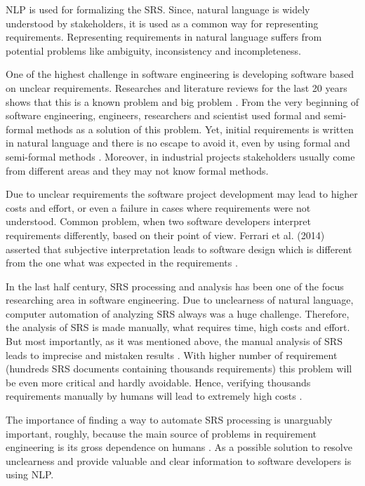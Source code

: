 \begin{multicols*}{2}	
	\gls{NLP} is used for formalizing the \gls{SRS}. Since, natural language is widely understood by stakeholders, it is used as a common way for representing requirements. Representing requirements in natural language suffers from potential problems like ambiguity, inconsistency and incompleteness.
	
	One of the highest challenge in software engineering is developing software based on unclear requirements. Researches and literature reviews for the last 20 years shows that this is a known problem and big problem \cite{Besrour}. From the very beginning of software engineering, engineers, researchers and scientist used formal and semi-formal methods as a solution of this problem. Yet, initial requirements is written in natural language and there is no escape to avoid it, even by using formal and semi-formal methods \cite{Kamsties}. Moreover, in industrial projects stakeholders usually come from different areas and they may not know formal methods.
	
	Due to unclear requirements the software project development may lead to higher costs and effort, or even a failure in cases where requirements were not understood.
	Common problem, when two software developers interpret requirements differently, based on their point of view. Ferrari et al. (2014) asserted that subjective interpretation leads to software design which is different from the one what was expected in the requirements \cite{Ferrari}.
	
	In the last half century, \gls{SRS} processing and analysis has been one of the focus researching area in software engineering. Due to unclearness of natural language, computer automation of analyzing \gls{SRS} always was a huge challenge. Therefore, the analysis of \gls{SRS} is made manually, what requires time, high costs and effort. But most importantly, as it was mentioned above, the manual analysis of \gls{SRS} leads to imprecise and mistaken results \cite{Wang}. With higher number of requirement (hundreds \gls{SRS} documents containing thousands requirements) this problem will be even more critical and hardly avoidable. Hence, verifying thousands requirements manually by humans will lead to extremely high costs \cite{Fanmuy}.
	
	The importance of finding a way to automate \gls{SRS} processing is unarguably important, roughly, because the main source of problems in requirement engineering is its gross dependence on humans \cite{Ahmed}. As a possible solution to resolve unclearness and provide valuable and clear information to software developers is using \gls{NLP}.
	

\end{multicols*}
